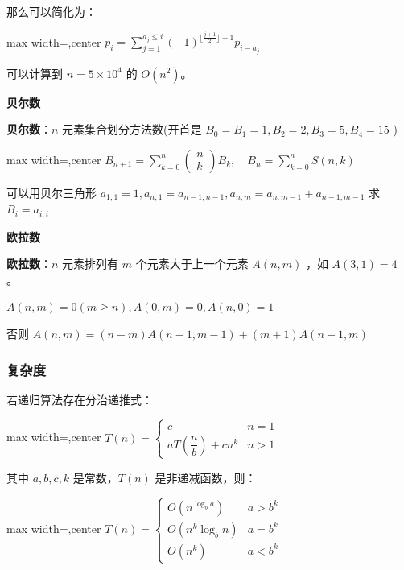 \documentclass[twocolumn,10pt]{ctexart}
\makeatletter
\newcommand{\hsix}[1]{\par\addvspace{4pt}\@afterindentfalse
  {\noindent\bfseries\small #1}\par\nobreak\vspace{1pt}}
\newcommand{\Omicron}{O}
\makeatother
\begin{document}
那么可以简化为：

\begin{adjustbox}{max width=\linewidth,center}
$p_i=\sum_{j=1}^{a_j\le i}(-1)^{\lfloor\frac{j+1}{2}\rfloor+1}p_{i-a_{j}}$
\end{adjustbox}

可以计算到 $n=5\times10^4$ 的 $O(n^2)$。

\hsix{贝尔数}

\textbf{贝尔数}：$n$ 元素集合划分方法数(开首是 $B_0=B_1=1,B_2=2,B_3=5,B_4=15$ )

\begin{adjustbox}{max width=\linewidth,center}
$B_{n+1}=\sum_{k=0}^n\begin{pmatrix}n\\k\end{pmatrix}B_k,\quad B_n=\sum_{k=0}^nS(n,k)$
\end{adjustbox}

可以用贝尔三角形 $a_{1,\allowbreak{}1}=1,\allowbreak{}a_{n,\allowbreak{}1}=a_{n-1,\allowbreak{}n-1},\allowbreak{}a_{n,\allowbreak{}m}=a_{n,\allowbreak{}m-1}+a_{n-1,\allowbreak{}m-1}$ 求 $B_i=a_{i,i}$

\hsix{欧拉数}

\textbf{欧拉数}：$n$ 元素排列有 $m$ 个元素大于上一个元素 $A(n,m)$ ，如 $A(3,1)=4$ 。

$A(n,\allowbreak{}m)=0(m\ge n),\allowbreak{} A(0,\allowbreak{}m)=0,\allowbreak{} A(n,\allowbreak{}0)=1$

否则 $A(n,\allowbreak{}m)=(n-m)A(n-1,\allowbreak{}m-1)+(m+1)A(n-1,\allowbreak{}m)$

\subsubsection{复杂度}

若递归算法存在分治递推式：

\begin{adjustbox}{max width=\linewidth,center}
$T(n)=\begin{cases}c&n=1\\aT(\dfrac nb)+cn^k&n>1\end{cases}$
\end{adjustbox}

其中 $a,b,c,k$ 是常数，$T(n)$ 是非递减函数，则：

\begin{adjustbox}{max width=\linewidth,center}
$T(n)=\begin{cases}\Omicron(n^{\log_ba})&a>b^k\\
\Omicron(n^k\log_bn)&a=b^k\\
\Omicron(n^k)&a<b^k\end{cases}$
\end{adjustbox}
\end{document}
